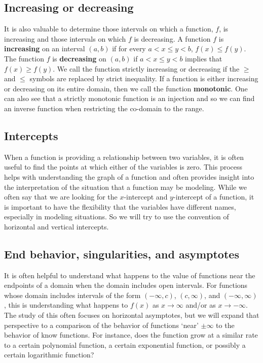 \documentclass[
]{book}
\theoremstyle{definition}
\theoremstyle{definition}
\theoremstyle{definition}
\theoremstyle{remark}
\begin{document}
\hypertarget{increasing-or-decreasing}{%
\subsection{Increasing or decreasing}\label{increasing-or-decreasing}}

It is also valuable to determine those intervals on which a function, \(f\), is increasing and those intervals on which \(f\) is decreasing. A function \(f\) is \textbf{increasing} on an interval \((a,b)\) if for every \(a<x\leq y<b\), \(f(x)\leq f(y)\). The function \(f\) is \textbf{decreasing} on \((a,b)\) if \(a<x\leq y<b\) implies that \(f(x)\geq f(y)\). We call the function strictly increasing or decreasing if the \(\geq\) and \(\leq\) symbols are replaced by strict inequality. If a function is either increasing or decreasing on its entire domain, then we call the function \textbf{monotonic}. One can also see that a strictly monotonic function is an injection and so we can find an inverse function when restricting the co-domain to the range.

\hypertarget{intercepts}{%
\subsection{Intercepts}\label{intercepts}}

When a function is providing a relationship between two variables, it is often useful to find the points at which either of the variables is zero. This process helps with understanding the graph of a function and often provides insight into the interpretation of the situation that a function may be modeling. While we often say that we are looking for the \(x\)-intercept and \(y\)-intercept of a function, it is important to have the flexibility that the variables have different names, especially in modeling situations. So we will try to use the convention of horizontal and vertical intercepts.

\hypertarget{end-behavior-singularities-and-asymptotes}{%
\subsection{End behavior, singularities, and asymptotes}\label{end-behavior-singularities-and-asymptotes}}

It is often helpful to understand what happens to the value of functions near the endpoints of a domain when the domain includes open intervals. For functions whose domain includes intervals of the form \((-\infty,c)\), \((c,\infty)\), and \((-\infty, \infty)\), this is understanding what happens to \(f(x)\) as \(x\rightarrow \infty\) and/or as \(x \rightarrow -\infty\). The study of this often focuses on horizontal asymptotes, but we will expand that perspective to a comparison of the behavior of functions `near' \(\pm \infty\) to the behavior of know functions. For instance, does the function grow at a similar rate to a certain polynomial function, a certain exponential function, or possibly a certain logarithmic function?
\end{document}
